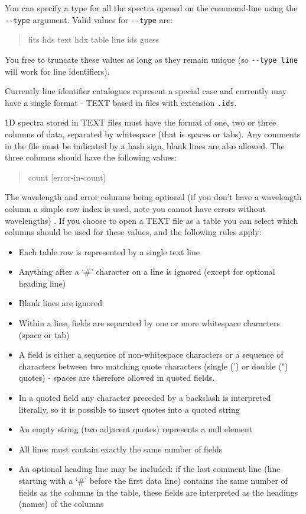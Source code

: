 \documentclass[twoside,11pt,nolof]{starlink}
\providecommand{\hitext}[1]{\texttt{#1}}
\begin{document}
You can specify a type for all the spectra opened on the command-line using
the
\verb|--type| argument. Valid values for \verb|--type| are:
\begin{quote}
\begin{terminalv}
  fits
  hds
  text
  hdx
  table
  line ids
  guess
\end{terminalv}
\end{quote}
You free to truncate these values as long as they remain unique (so
\verb|--type line| will work for line identifiers).

Currently line identifier catalogues represent a special case and currently
may have a single format - TEXT based in files with extension \hitext{.ids}.

1D spectra stored in TEXT files must have the format of one, two or three
columns of data, separated by whitespace (that is spaces or tabs). Any
comments in the file must be indicated by a hash sign, blank lines are also
allowed. The three columns should have the following values:
\begin{quote}
\begin{terminalv}
  [wavelength] count [error-in-count]
\end{terminalv}
\end{quote}
The wavelength and error columns being optional (if you don't have a
wavelength column a simple row index is used, note you cannot have errors
without wavelengths) . If you choose to open a TEXT file as a table you can
select which columns should be used for these values, and the following rules
apply:
\begin{itemize}
\item Each table row is represented by a single text line
\item Anything after a `\#' character on a line is ignored (except for optional
      heading line)
\item Blank lines are ignored
\item Within a line, fields are separated by one or more whitespace characters
      (space or tab)
\item A field is either a sequence of non-whitespace characters or a sequence
      of characters between two matching quote characters (single (') or double (")
      quotes) - spaces are therefore allowed in quoted fields.
\item In a quoted field any character preceded by a backslash is interpreted
      literally, so it is possible to insert quotes into a quoted string
\item An empty string (two adjacent quotes) represents a null element
\item All lines must contain exactly the same number of fields
\item An optional heading line may be included: if the last comment line (line
      starting with a `\#' before the first data line) contains the same number of
      fields as the columns in the table, these fields are interpreted as the
      headings (names) of the columns
\end{itemize}
\end{document}
